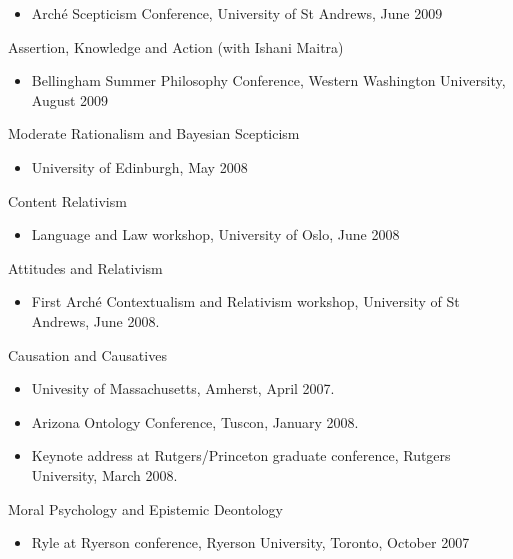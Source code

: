 \documentclass[
  10pt,
  letterpaper,
  DIV=11,
  numbers=noendperiod,
  twoside]{scrartcl}
\providecommand{\tightlist}{%
  \setlength{\itemsep}{0pt}\setlength{\parskip}{0pt}}\usepackage{longtable,booktabs,array}
\begin{document}
\begin{itemize}
\tightlist
\item
  Arché Scepticism Conference, University of St Andrews, June 2009
\end{itemize}

Assertion, Knowledge and Action (with Ishani Maitra)

\begin{itemize}
\tightlist
\item
  Bellingham Summer Philosophy Conference, Western Washington
  University, August 2009
\end{itemize}

Moderate Rationalism and Bayesian Scepticism

\begin{itemize}
\tightlist
\item
  University of Edinburgh, May 2008
\end{itemize}

Content Relativism

\begin{itemize}
\tightlist
\item
  Language and Law workshop, University of Oslo, June 2008
\end{itemize}

Attitudes and Relativism

\begin{itemize}
\tightlist
\item
  First Arché Contextualism and Relativism workshop, University of St
  Andrews, June 2008.
\end{itemize}

Causation and Causatives

\begin{itemize}
\tightlist
\item
  Univesity of Massachusetts, Amherst, April 2007.
\item
  Arizona Ontology Conference, Tuscon, January 2008.
\item
  Keynote address at Rutgers/Princeton graduate conference, Rutgers
  University, March 2008.
\end{itemize}

Moral Psychology and Epistemic Deontology

\begin{itemize}
\tightlist
\item
  Ryle at Ryerson conference, Ryerson University, Toronto, October 2007
\end{itemize}
\end{document}
